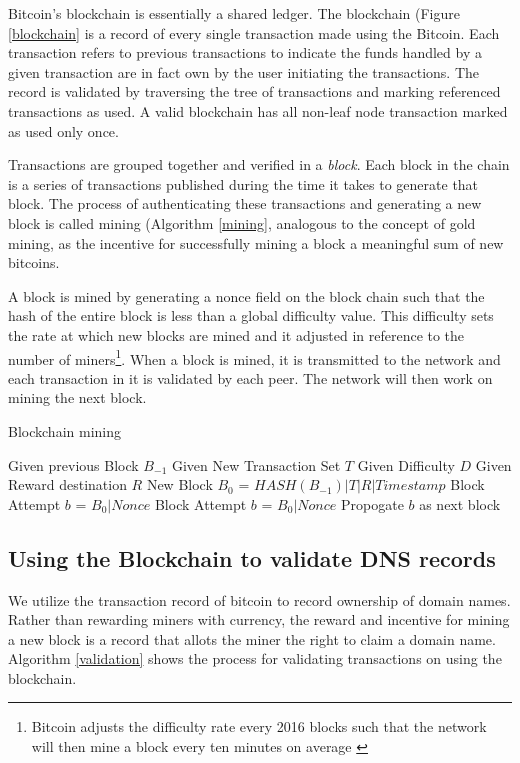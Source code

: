 \documentclass[11pt]{IEEEtran} %
\begin{document}
Bitcoin's blockchain is essentially a shared ledger.  The blockchain (Figure \ref{blockchain} is a record of every single transaction made using the Bitcoin. Each transaction refers to previous transactions to indicate the funds handled by a given transaction are in fact own by the user initiating the transactions. The record is validated by traversing the tree of transactions and marking referenced transactions as used. A valid blockchain has all non-leaf node transaction marked as used only once.



Transactions are grouped together and verified in a \emph{block}.  Each block in the chain is a series of transactions published during the time it takes to generate that block. The process of authenticating these transactions and generating a new block is called mining (Algorithm \ref{mining}, analogous to the concept of gold mining, as the incentive for successfully mining a block a meaningful sum of new bitcoins.  

A block is mined by generating a nonce field on the block chain such that the hash of the entire block is less than a global difficulty value. This difficulty sets the rate at which new blocks are mined and it adjusted in reference to the number of miners\footnote{Bitcoin adjusts the difficulty rate every 2016 blocks such that the network will then mine a block every ten minutes on average \cite{bitdiff}}.  When a block is mined, it is transmitted to the network and each transaction in it is validated by each peer. The network will then work on mining the next block.

\begin{algorithm}
\caption{Blockchain mining}
\label{mining}
\begin{algorithmic}[1]  %
\STATE Given previous Block $B_{-1}$
\STATE Given New Transaction Set $T$
\STATE Given Difficulty $D$
\STATE Given Reward destination $R$
\STATE New Block $B_0$ = $HASH(B_{-1})|T|R|Timestamp$
\STATE Block Attempt $b$ = $B_0|Nonce$
	\STATE Block Attempt $b$ = $B_0|Nonce$
\ENDWHILE
\STATE Propogate $b$ as next block
\end{algorithmic}
\end{algorithm}


\subsection{Using the Blockchain to validate DNS records}
We utilize the transaction record of bitcoin to record ownership of domain names. Rather than rewarding miners with currency,  the reward and incentive for mining a new block is a record that allots the miner the right to claim a domain name.  Algorithm \ref{validation} shows the process for validating transactions on using the blockchain.
\end{document}
